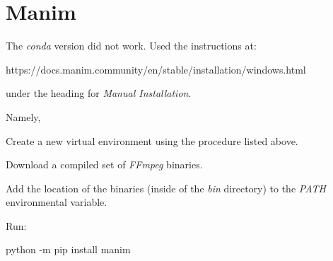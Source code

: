 	
	\section{Manim}
The \textit{conda} version did not work.  Used the instructions at:
	\begin{code}[\codenumbering]{}
		\codeitemnonumber https://docs.manim.community/en/stable/installation/windows.html
	\end{code}%
under the heading for \textit{Manual Installation}.

Namely,
	\begin{numberedlist}
		\item Create a new virtual environment using the procedure listed above.
		\item Download a compiled set of \textit{FFmpeg} binaries.
		\item Add the location of the binaries (inside of the \textit{bin} directory) to the \textit{PATH} environmental variable.
		\item Run:
		\begin{code}[\codenumbering]{}
			\codeitemnonumber python -m pip install manim
		\end{code}
	\end{numberedlist} 